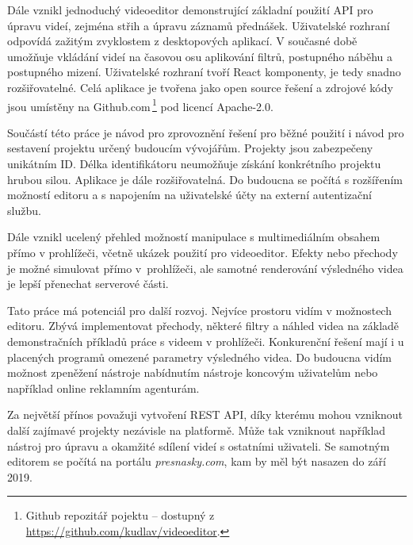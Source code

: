 Dále vznikl jednoduchý videoeditor demonstrující základní použití API pro úpravu videí, zejména střih a úpravu záznamů přednášek. Uživatelské rozhraní odpovídá zažitým zvyklostem z desktopových aplikací. V současné době umožňuje vkládání videí na časovou osu aplikování filtrů, postupného náběhu a postupného mizení. Uživatelské rozhraní tvoří React komponenty, je tedy snadno rozšiřovatelné. Celá aplikace je tvořena jako open source řešení a zdrojové kódy jsou umístěny na Github.com\,\footnote{Github repozitář pojektu -- dostupný z \url{https://github.com/kudlav/videoeditor}.} pod licencí Apache-2.0.

Součástí této práce je návod pro zprovoznění řešení pro běžné použití i návod pro sestavení projektu určený budoucím vývojářům. Projekty jsou zabezpečeny unikátním ID. Délka identifikátoru neumožňuje získání konkrétního projektu hrubou silou. Aplikace je dále rozšiřovatelná. Do budoucna se počítá s rozšířením možností editoru a s napojením na uživatelské účty na externí autentizační službu.

Dále vznikl ucelený přehled možností manipulace s multimediálním obsahem přímo v prohlížeči, včetně ukázek použití pro videoeditor. Efekty nebo přechody je možné simulovat přímo v~prohlížeči, ale samotné renderování výsledného videa je lepší přenechat serverové části.

Tato práce má potenciál pro další rozvoj. Nejvíce prostoru vidím v možnostech editoru. Zbývá implementovat přechody, některé filtry a náhled videa na základě demonstračních příkladů práce s videem v prohlížeči. Konkurenční řešení mají i u placených programů omezené parametry výsledného videa. Do budoucna vidím možnost zpeněžení nástroje nabídnutím nástroje koncovým uživatelům nebo například online reklamním agenturám.

Za největší přínos považuji vytvoření REST API, díky kterému mohou vzniknout další zajímavé projekty nezávisle na platformě. Může tak vzniknout například nástroj pro úpravu a okamžité sdílení videí s ostatními uživateli. Se samotným editorem se počítá na portálu \textit{presnasky.com}, kam by měl být nasazen do září 2019.

